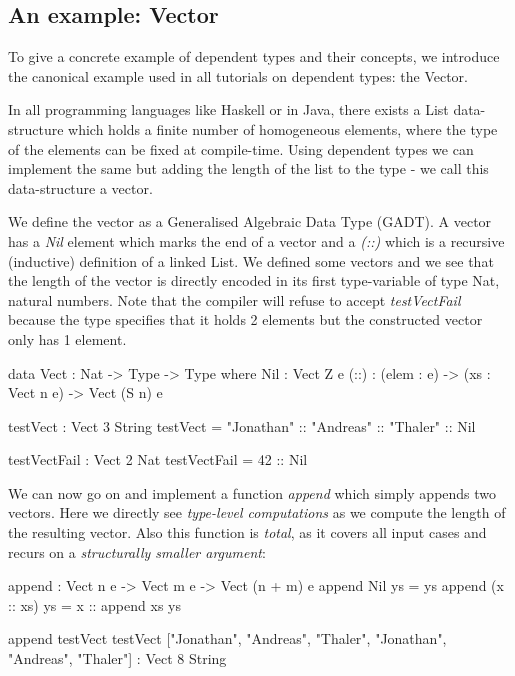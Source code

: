 \subsection{An example: Vector}
\label{sub:dep_vector}
To give a concrete example of dependent types and their concepts, we introduce the canonical example used in all tutorials on dependent types: the Vector.

In all programming languages like Haskell or in Java, there exists a List data-structure which holds a finite number of homogeneous elements, where the type of the elements can be fixed at compile-time. Using dependent types we can implement the same but adding the length of the list to the type - we call this data-structure a vector.

We define the vector as a Generalised Algebraic Data Type (GADT). A vector has a \textit{Nil} element which marks the end of a vector and a \textit{(::)} which is a recursive (inductive) definition of a linked List. We defined some vectors and we see that the length of the vector is directly encoded in its first type-variable of type Nat, natural numbers. Note that the compiler will refuse to accept \textit{testVectFail} because the type specifies that it holds 2 elements but the constructed vector only has 1 element.

\begin{HaskellCode}
data Vect : Nat -> Type -> Type where
     Nil  : Vect Z e
     (::) : (elem : e) -> (xs : Vect n e) -> Vect (S n) e
	
testVect : Vect 3 String
testVect = "Jonathan" :: "Andreas" :: "Thaler" :: Nil

testVectFail : Vect 2 Nat
testVectFail = 42 :: Nil
\end{HaskellCode}

We can now go on and implement a function \textit{append} which simply appends two vectors. Here we directly see \textit{type-level computations} as we compute the length of the resulting vector. Also this function is \textit{total}, as it covers all input cases and recurs on a \textit{structurally smaller argument}:

\begin{HaskellCode}
append : Vect n e -> Vect m e -> Vect (n + m) e
append Nil ys = ys
append (x :: xs) ys = x :: append xs ys

append testVect testVect
["Jonathan", "Andreas", "Thaler", "Jonathan", "Andreas", "Thaler"] : Vect 8 String
\end{HaskellCode}

